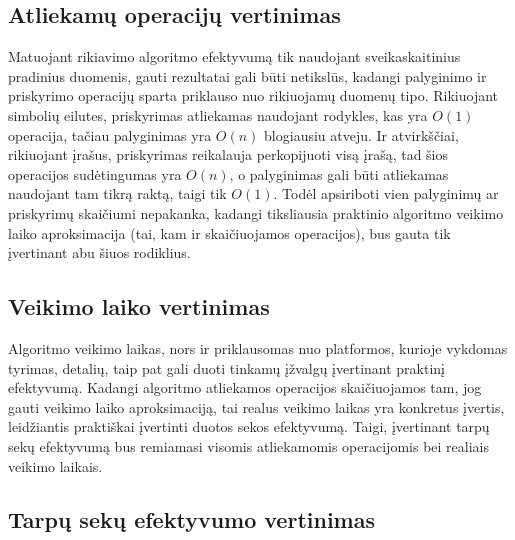 \documentclass{VUMIFInfKursinis}
\begin{document}
\subsection{Atliekamų operacijų vertinimas}

Matuojant rikiavimo algoritmo efektyvumą tik naudojant sveikaskaitinius pradinius duomenis, gauti rezultatai gali būti netikslūs,
kadangi palyginimo ir priskyrimo operacijų sparta priklauso nuo rikiuojamų duomenų tipo.
Rikiuojant simbolių eilutes, priskyrimas atliekamas naudojant rodykles, kas yra $O(1)$ operacija,
tačiau palyginimas yra $O(n)$ blogiausiu atveju.
Ir atvirkščiai, rikiuojant įrašus, priskyrimas reikalauja perkopijuoti visą įrašą, tad šios operacijos sudėtingumas yra $O(n)$,
o palyginimas gali būti atliekamas naudojant tam tikrą raktą, taigi tik $O(1)$.
Todėl apsiriboti vien palyginimų ar priskyrimų skaičiumi nepakanka, kadangi tiksliausia praktinio algoritmo
veikimo laiko aproksimacija (tai, kam ir skaičiuojamos operacijos), bus gauta tik įvertinant abu šiuos rodiklius.

\subsection{Veikimo laiko vertinimas}

Algoritmo veikimo laikas, nors ir priklausomas nuo platformos, kurioje vykdomas tyrimas, detalių,
taip pat gali duoti tinkamų įžvalgų įvertinant praktinį efektyvumą.
Kadangi algoritmo atliekamos operacijos skaičiuojamos tam, jog gauti
veikimo laiko aproksimaciją, tai realus veikimo laikas
yra konkretus įvertis, leidžiantis praktiškai įvertinti duotos sekos efektyvumą.
Taigi, įvertinant tarpų sekų efektyvumą bus remiamasi visomis atliekamomis operacijomis bei realiais veikimo laikais.

\subsection{Tarpų sekų efektyvumo vertinimas}
\end{document}
